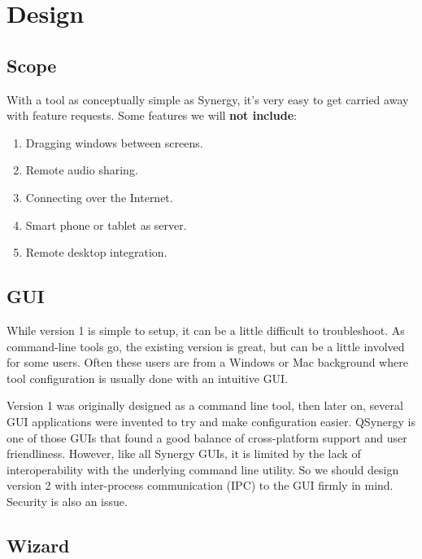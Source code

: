 \section{Design}

\subsection{Scope}

With a tool as conceptually simple as Synergy, it's very easy to get carried
away with feature requests. Some features we will \textbf{not include}:

\begin{enumerate}
  \item Dragging windows between screens.
  \item Remote audio sharing.
  \item Connecting over the Internet.
  \item Smart phone or tablet as server.
  \item Remote desktop integration.
\end{enumerate}

\subsection{GUI}


While version 1 is simple to setup, it can be a little difficult to
troubleshoot. As command-line tools go, the existing version is great, but
can be a little involved for some users. Often these users are from a Windows
or Mac background where tool configuration is usually done with an intuitive
GUI.

Version 1 was originally designed as a command line tool, then later on, several
GUI applications were invented to try and make configuration easier. QSynergy is
one of those GUIs that found a good balance of cross-platform support and user 
friendliness. However, like all Synergy GUIs, it is limited by the lack of 
interoperability with the underlying command line utility. So we should design 
version 2 with inter-process communication (IPC) to the GUI firmly in mind. 
Security is also an issue.

\subsection{Wizard}


